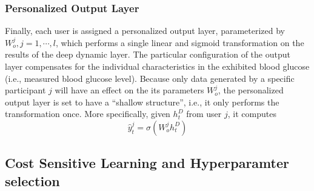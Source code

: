 \subsubsection{Personalized Output Layer}
Finally, each user is assigned a personalized output layer, parameterized by $W_o^j, j=1,\cdots,l$, which performs a single linear and sigmoid transformation on the results of the deep dynamic layer. The particular configuration of the output layer compensates for the individual characteristics in the exhibited blood glucose (i.e., measured blood glucose level). Because only data generated by a specific participant $j$ will have an effect on the its parameters $W_o^j$, the personalized output layer is set to have a ``shallow structure'', i.e., it only performs the transformation once. More specifically, given $h^D_t$ from user $j$, it computes
\begin{equation}
\hat{y}_t^j = \sigma \left( W_o^j h^D_t \right)
\end{equation}

\subsection{Cost Sensitive Learning and Hyperparamter selection}




